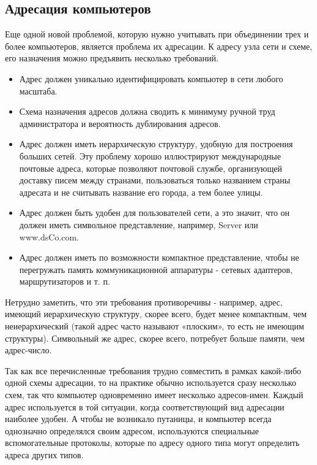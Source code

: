 \subsection{Адресация компьютеров}

Еще одной новой проблемой, которую нужно учитывать при объединении трех и более компьютеров, является проблема их адресации.
К адресу узла сети и схеме, его назначения можно предъявить несколько требований.
\begin{itemize}
    \item Адрес должен уникально идентифицировать компьютер в сети любого масштаба.
    \item Схема назначения адресов должна сводить к минимуму ручной труд администратора и вероятность дублирования адресов.
    \item Адрес должен иметь иерархическую структуру, удобную для построения больших сетей.
        Эту проблему хорошо иллюстрируют международные почтовые адреса, которые позволяют почтовой службе, организующей доставку писем между странами, пользоваться только названием страны адресата и не считывать название его города, а тем более улицы.
    \item Адрес должен быть удобен для пользователей сети, а это значит, что он должен иметь символьное представление, например, Server или www.dsCo.com.
    \item Адрес должен иметь по возможности компактное представление, чтобы не перегружать память коммуникационной аппаратуры - сетевых адаптеров,  маршрутизаторов и т. п.
\end{itemize}

Нетрудно заметить, что эти требования противоречивы - например, адрес, имеющий иерархическую структуру, скорее всего, будет менее компактным, чем неиерархический (такой адрес часто называют «плоским», то есть не имеющим структуры).
Символьный же адрес, скорее всего, потребует больше памяти, чем адрес-число.

Так как все перечисленные требования трудно совместить в рамках какой-либо одной схемы адресации, то на практике обычно используется сразу несколько схем, так что компьютер одновременно имеет несколько адресов-имен.
Каждый адрес используется в той ситуации, когда соответствующий вид адресации наиболее удобен.
А чтобы не возникало путаницы, и компьютер всегда однозначно определялся своим адресом, используются специальные вспомогательные протоколы, которые по адресу одного типа могут определить адреса других типов.

